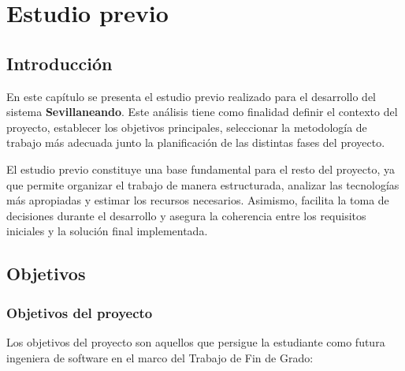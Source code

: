 \chapter{Estudio previo}\label{cap:planificación}

\section{Introducción}

En este capítulo se presenta el estudio previo realizado para el desarrollo del sistema \textbf{Sevillaneando}. Este análisis tiene como finalidad definir el contexto del proyecto, establecer los objetivos principales, seleccionar la metodología de trabajo más adecuada junto la planificación de las distintas fases del proyecto.

El estudio previo constituye una base fundamental para el resto del proyecto, ya que permite organizar el trabajo de manera estructurada, analizar las tecnologías más apropiadas y estimar los recursos necesarios. Asimismo, facilita la toma de decisiones durante el desarrollo y asegura la coherencia entre los requisitos iniciales y la solución final implementada.

\section{Objetivos}

\subsection{Objetivos del proyecto}

Los objetivos del proyecto son aquellos que persigue la estudiante como futura ingeniera de software en el marco del Trabajo de Fin de Grado:

